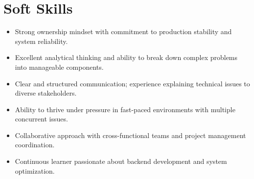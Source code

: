 \documentclass[letterpaper,11pt]{article}
\newcommand{\resumeSubHeadingListStart}{\begin{itemize}[leftmargin=*]}
\newcommand{\resumeSubHeadingListEnd}{\end{itemize}}
\begin{document}
\section{Soft Skills}
  \resumeSubHeadingListStart
    \item{
     Strong ownership mindset with commitment to production stability and system reliability.
    }
    \item{
     Excellent analytical thinking and ability to break down complex problems into manageable components.
    }
    \item{
     Clear and structured communication; experience explaining technical issues to diverse stakeholders.
    }
    \item{
     Ability to thrive under pressure in fast-paced environments with multiple concurrent issues.
    }
    \item{
     Collaborative approach with cross-functional teams and project management coordination.
    }
    \item{
     Continuous learner passionate about backend development and system optimization.
    }
  \resumeSubHeadingListEnd

\end{document}
